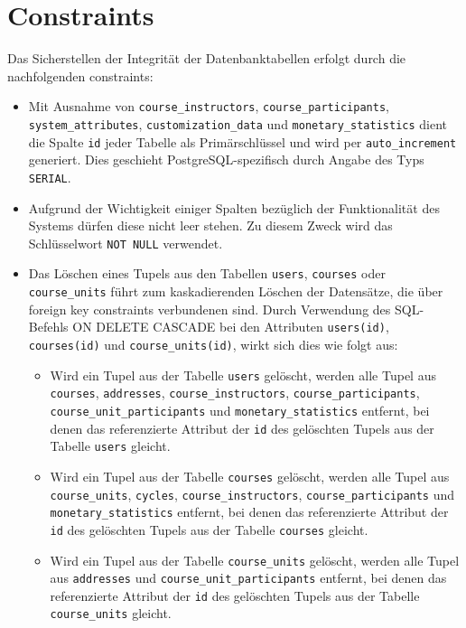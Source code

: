 \section{Constraints}
Das Sicherstellen der Integrität der Datenbanktabellen erfolgt durch die nachfolgenden constraints:

\begin{itemize}
\item Mit Ausnahme von \texttt{course\_instructors}, \texttt{course\_participants}, \texttt{system\_attributes}, \texttt{customization\_data} und \texttt{monetary\_statistics} dient die Spalte \texttt{id} jeder Tabelle als Primärschlüssel und wird per \texttt{auto\_increment} generiert. Dies geschieht PostgreSQL-spezifisch durch Angabe des Typs \texttt{SERIAL}.
\item Aufgrund der Wichtigkeit einiger Spalten bezüglich der Funktionalität des Systems dürfen diese nicht leer stehen. Zu diesem Zweck wird das Schlüsselwort \texttt{NOT NULL} verwendet.
\item Das Löschen eines Tupels aus den Tabellen \texttt{users}, \texttt{courses} oder \texttt{course\_units} führt zum kaskadierenden Löschen der Datensätze, die über foreign key constraints verbundenen sind. Durch Verwendung des SQL-Befehls ON DELETE CASCADE bei den Attributen \texttt{users(id)}, \texttt{courses(id)} und \texttt{course\_units(id)}, wirkt sich dies wie folgt aus:

\begin{itemize}
\item Wird ein Tupel aus der Tabelle \texttt{users} gelöscht, werden alle Tupel aus \texttt{courses}, \texttt{addresses}, \texttt{course\_instructors}, \texttt{course\_participants}, \texttt{course\_unit\_participants} und \texttt{monetary\_statistics} entfernt, bei denen das referenzierte Attribut der \texttt{id} des gelöschten Tupels aus der Tabelle \texttt{users} gleicht.

\item Wird ein Tupel aus der Tabelle \texttt{courses} gelöscht, werden alle Tupel aus \texttt{course\_units}, \texttt{cycles}, \texttt{course\_instructors}, \texttt{course\_participants} und \texttt{monetary\_statistics} entfernt, bei denen das referenzierte Attribut der \texttt{id} des gelöschten Tupels aus der Tabelle \texttt{courses} gleicht.

\item Wird ein Tupel aus der Tabelle \texttt{course\_units} gelöscht, werden alle Tupel aus \texttt{addresses} und \texttt{course\_unit\_participants} entfernt, bei denen das referenzierte Attribut der \texttt{id} des gelöschten Tupels aus der Tabelle \texttt{course\_units} gleicht.
\end{itemize}


\end{itemize}
